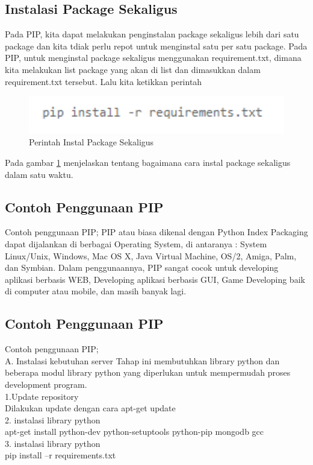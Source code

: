 \documentclass[12pt,a4paper]{article}
\begin{document}
\begin{itemize}
\subsection{Instalasi Package Sekaligus}
Pada PIP, kita dapat melakukan penginstalan package sekaligus lebih dari satu package dan  kita tdiak perlu repot untuk menginstal satu per satu package. Pada PIP, untuk menginstal package sekaligus menggunakan requirement.txt, dimana kita melakukan list package yang akan di list dan dimasukkan dalam requirement.txt tersebut. Lalu kita ketikkan perintah
\begin{figure}[h]
\begin{center}
\includegraphics[width=1\textwidth]{../figures/1requre.png}
\caption{Perintah Instal Package Sekaligus}
\label{1require} 
\end{center}
\end{figure}
Pada gambar \ref{1require} menjelaskan tentang bagaimana cara instal package sekaligus dalam satu waktu.
\end{itemize}
\subsection{Contoh Penggunaan PIP}
Contoh penggunaan PIP;
PIP atau biasa dikenal dengan Python Index Packaging dapat dijalankan di berbagai Operating System, di antaranya : System Linux/Unix, Windows, Mac OS X, Java Virtual Machine, OS/2, Amiga, Palm, dan Symbian. Dalam penggunaannya, PIP sangat cocok untuk developing aplikasi berbasis WEB, Developing aplikasi berbasis GUI, Game Developing baik di computer atau mobile, dan masih banyak lagi.
\subsection{Contoh Penggunaan PIP}
Contoh penggunaan PIP;\\
A. Instalasi kebutuhan server
Tahap ini membutuhkan library python dan beberapa modul library python yang diperlukan untuk mempermudah proses development program.\\
1.Update repository\\
Dilakukan update dengan cara apt-get update\\
2. instalasi library python\\
apt-get install python-dev python-setuptools python-pip mongodb gcc\\
3. instalasi library python\\
pip install –r requirements.txt
\end{document}
